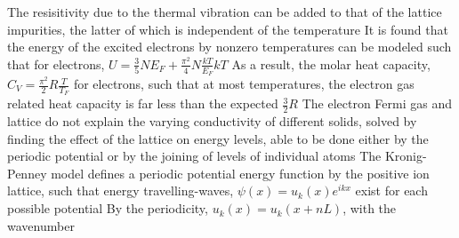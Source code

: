 \documentclass[11 pt, twoside]{article}
\newenvironment{outline*}
{
	\begin{outline}[enumerate]
	}
	{\end{outline}
}
\begin{document}
\begin{outline*}
	\2 The resisitivity due to the thermal vibration can be added to that of the lattice impurities, the latter of which is independent of the temperature
	\2 It is found that the energy of the excited electrons by nonzero temperatures can be modeled such that for electrons, $U = \frac{3}{5}NE_F + \frac{\pi^2}{4} N \frac{kT}{E_F}kT$
		\3 As a result, the molar heat capacity, $C_V = \frac{\pi^2}{2}R\frac{T}{T_F}$ for electrons, such that at most temperatures, the electron gas related heat capacity is far less than the expected $\frac{3}{2}R$
\1 The electron Fermi gas and lattice do not explain the varying conductivity of different solids, solved by finding the effect of the lattice on energy levels, able to be done either by the periodic potential or by the joining of levels of individual atoms
	\2 The Kronig-Penney model defines a periodic potential energy function by the positive ion lattice, such that energy travelling-waves, $\psi(x) = u_k(x)e^{ikx}$ exist for each possible potential
		\3 By the periodicity, $u_k(x) = u_k(x + nL)$, with the wavenumber
\end{outline*}
\end{document}
